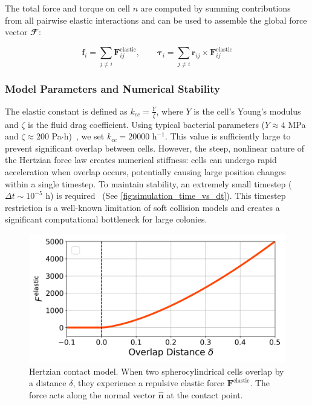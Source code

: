 \documentclass[conference]{IEEEtran}
\begin{document}
The total force and torque on cell $n$ are computed by summing contributions from all pairwise elastic interactions and can be used to assemble the global force vector $\mathbfcal{F}$:

\begin{equation} \label{eq:force_assembly}
    \mathbf{f}_i         = \sum_{j \neq i} \mathbf{F}^{\text{elastic}}_{ij}, \qquad
    \boldsymbol{\tau}_i  = \sum_{j \neq i} \mathbf{r}_{ij} \times \mathbf{F}^{\text{elastic}}_{ij}
\end{equation}

\subsubsection{Model Parameters and Numerical Stability}

The elastic constant is defined as $k_{cc} = \frac{Y}{\zeta}$, where $Y$ is the cell's Young's modulus and $\zeta$ is the fluid drag coefficient. Using typical bacterial parameters ($Y \approx 4$ MPa and $\zeta \approx 200$ Pa$\cdot$h)~\cite{You2018, Blanchard2015}, we set $k_{cc} = 20000$ h$^{-1}$. This value is sufficiently large to prevent significant overlap between cells. However, the steep, nonlinear nature of the Hertzian force law creates numerical stiffness: cells can undergo rapid acceleration when overlap occurs, potentially causing large position changes within a single timestep. To maintain stability, an extremely small timestep ($\Delta t \sim 10^{-5}$ h) is required~\cite{Khan_2024, You2018, Blanchard2015} (See \autoref{fig:simulation_time_vs_dt}). This timestep restriction is a well-known limitation of soft collision models and creates a significant computational bottleneck for large colonies.

\begin{figure}[H]
    \centering
    \includegraphics[width=\linewidth]{figures/hertzian_contact_model.png}
    \caption{Hertzian contact model. When two spherocylindrical cells overlap by a distance $\delta$, they experience a repulsive elastic force $\mathbf{F}^{\text{elastic}}$. The force acts along the normal vector $\hat{\mathbf{n}}$ at the contact point.}
    \label{fig:hertzian_contact_model}
\end{figure}
\end{document}
